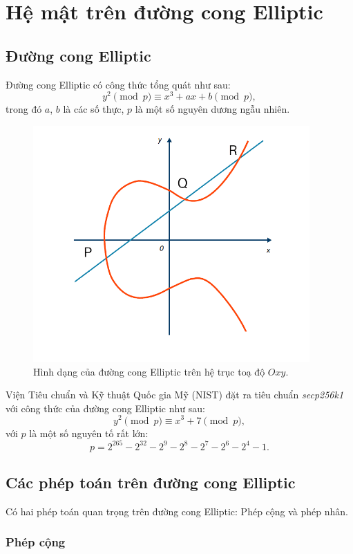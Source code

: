 \section{Hệ mật trên đường cong Elliptic}

\subsection{Đường cong Elliptic}

Đường cong Elliptic có công thức tổng quát như sau:
$$
y^2\pmod{p}\equiv x^3+ax+b\pmod{p},
$$
trong đó $a$, $b$ là các số thực, $p$ là một số nguyên dương ngẫu nhiên.\\

\begin{figure}[!ht]
    \centering
    \includegraphics[width=400px]{anh/mat-ma-hoa-khoa-cong-khai/ecc.png}
    \caption{Hình dạng của đường cong Elliptic trên hệ trục toạ độ $Oxy$.}
\end{figure}

Viện Tiêu chuẩn và Kỹ thuật Quốc gia Mỹ (NIST) đặt ra tiêu chuẩn \textit{secp256k1} với công thức của đường cong Elliptic như sau:
$$
y^2\pmod{p}\equiv x^3+7\pmod{p},
$$
với $p$ là một số nguyên tố rất lớn:
$$
p=2^{265}-2^{32}-2^9-2^8-2^7-2^6-2^4-1.
$$

\subsection{Các phép toán trên đường cong Elliptic}

Có hai phép toán quan trọng trên đường cong Elliptic: Phép cộng và phép nhân.

\subsubsection*{Phép cộng}

